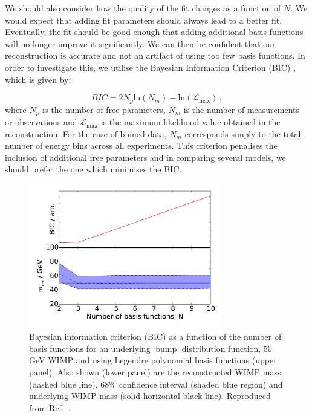 We should also consider how the quality of the fit changes as a function of $N$. We would expect that adding fit parameters should always lead to a better fit. Eventually, the fit should be good enough that adding additional basis functions will no longer improve it significantly. We can then be confident that our reconstruction is accurate and not an artifact of using too few basis functions. In order to investigate this, we utilise the Bayesian Information Criterion (BIC) \cite{Schwarz:1978}, which is given by:

\begin{equation}
BIC = 2N_p\textrm{ln}(N_m) - \textrm{ln}(\mathcal{L}_\textrm{max}) \, ,
\end{equation}
where $N_p$ is the number of free parameters, $N_m$ is the number of measurements or observations and $\mathcal{L}_\textrm{max}$ is the maximum likelihood value obtained in the reconstruction. For the case of binned data, $N_m$ corresponds simply to the total number of energy bins across all experiments. This criterion penalises the inclusion of additional free parameters and in comparing several models, we should prefer the one which minimises the BIC.

\begin{figure}[t!]
\centering
  \includegraphics[width=0.75\textwidth]{Poly/VaryingN_BUMP_LEG.pdf}
  \caption[Bayesian information criterion and reconstructed WIMP mass as a function of the number of basis functions for a 50 GeV WIMP with `bump' distribution function]{Bayesian information criterion (BIC) as a function of the number of basis functions for an underlying `bump' distribution function, 50 GeV WIMP and using Legendre polynomial basis functions (upper panel). Also shown (lower panel) are the reconstructed WIMP mass (dashed blue line), 68\% confidence interval (shaded blue region) and underlying WIMP mass (solid horizontal black line). Reproduced from Ref.~\cite{Kavanagh:2014}.}
  \label{fig:Poly:BUMP_LEG}
\end{figure}

